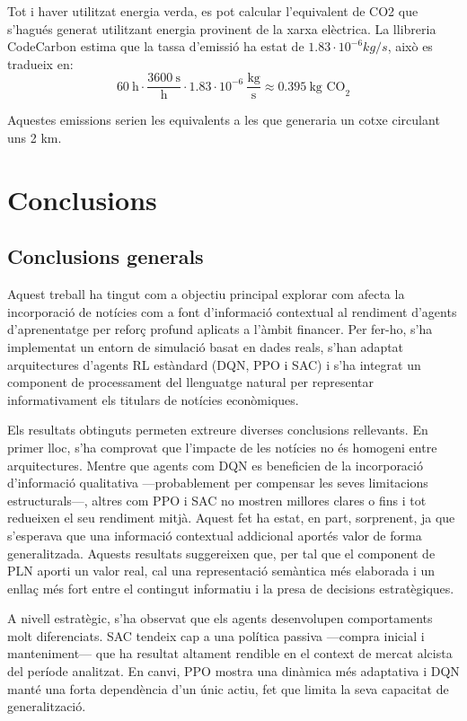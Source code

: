 \documentclass[12pt,a4paper,twoside]{book}
\begin{document}
Tot i haver utilitzat energia verda, es pot calcular l'equivalent de CO2 que s'hagués generat utilitzant energia provinent de la xarxa elèctrica. La llibreria CodeCarbon estima que la tassa d'emissió ha estat de $1.83\cdot10^{-6}kg/s$, això es tradueix en:
\[
60\ \text{h} \cdot \frac{3600\ \text{s}}{\text{h}} \cdot 1.83 \cdot 10^{-6}\ \frac{\text{kg}}{\text{s}} \approx 0.395\ \text{kg\ CO}_2
\]

Aquestes emissions serien les equivalents a les que generaria un cotxe circulant uns 2 km.

\section{Conclusions}

\subsection{Conclusions generals}

Aquest treball ha tingut com a objectiu principal explorar com afecta la incorporació de notícies com a font d’informació contextual al rendiment d’agents d’aprenentatge per reforç profund aplicats a l’àmbit financer. Per fer-ho, s’ha implementat un entorn de simulació basat en dades reals, s’han adaptat arquitectures d’agents RL estàndard (DQN, PPO i SAC) i s’ha integrat un component de processament del llenguatge natural per representar informativament els titulars de notícies econòmiques.

Els resultats obtinguts permeten extreure diverses conclusions rellevants. En primer lloc, s’ha comprovat que l’impacte de les notícies no és homogeni entre arquitectures. Mentre que agents com DQN es beneficien de la incorporació d’informació qualitativa —probablement per compensar les seves limitacions estructurals—, altres com PPO i SAC no mostren millores clares o fins i tot redueixen el seu rendiment mitjà. Aquest fet ha estat, en part, sorprenent, ja que s’esperava que una informació contextual addicional aportés valor de forma generalitzada. Aquests resultats suggereixen que, per tal que el component de PLN aporti un valor real, cal una representació semàntica més elaborada i un enllaç més fort entre el contingut informatiu i la presa de decisions estratègiques.

A nivell estratègic, s’ha observat que els agents desenvolupen comportaments molt diferenciats. SAC tendeix cap a una política passiva —compra inicial i manteniment— que ha resultat altament rendible en el context de mercat alcista del període analitzat. En canvi, PPO mostra una dinàmica més adaptativa i DQN manté una forta dependència d’un únic actiu, fet que limita la seva capacitat de generalització.
\end{document}
